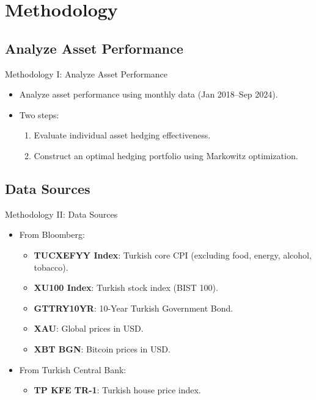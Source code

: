 \documentclass{beamer}
\begin{document}
\section{Methodology}
\subsection{Analyze Asset Performance}
\begin{frame}{Methodology I: Analyze Asset Performance}
\begin{itemize}
\item Analyze asset performance using monthly data (Jan 2018--Sep 2024).
\item Two steps:
\begin{enumerate}
\item Evaluate individual asset hedging effectiveness.
\item Construct an optimal hedging portfolio using Markowitz optimization.
\end{enumerate}
\end{itemize}
\end{frame}

\subsection{Data Sources}
\begin{frame}{Methodology II: Data Sources}
\begin{itemize}
\item From Bloomberg:
\begin{itemize}
\item \textbf{TUCXEFYY Index}: Turkish core CPI (excluding food, energy,
alcohol, tobacco).
\item \textbf{XU100 Index}: Turkish stock index (BIST 100).
\item \textbf{GTTRY10YR}: 10-Year Turkish Government Bond.
\item \textbf{XAU}: Global prices in USD. 
\item \textbf{XBT BGN}: Bitcoin prices in USD.
\end{itemize}
\item From Turkish Central Bank:
\begin{itemize}
\item \textbf{TP KFE TR-1}: Turkish house price index.
\end{itemize}
\end{itemize}
\end{frame}
\end{document}
